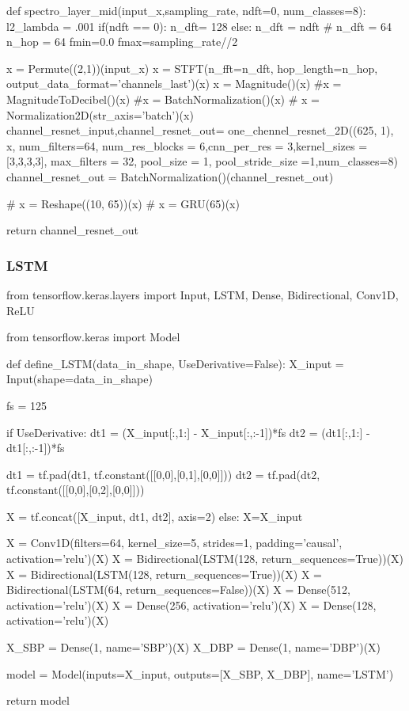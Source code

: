 \begin{python}
def spectro_layer_mid(input_x,sampling_rate, ndft=0, num_classes=8):
    l2_lambda = .001
    if(ndft == 0):
        n_dft= 128
    else:
        n_dft = ndft
    # n_dft = 64
    n_hop = 64
    fmin=0.0
    fmax=sampling_rate//2

    x = Permute((2,1))(input_x)
    x = STFT(n_fft=n_dft, hop_length=n_hop, output_data_format='channels_last')(x)
    x = Magnitude()(x)
    #x = MagnitudeToDecibel()(x)
    #x = BatchNormalization()(x)    # x = Normalization2D(str_axis='batch')(x)
    channel_resnet_input,channel_resnet_out= one_chennel_resnet_2D((625, 1), x, num_filters=64,
                    num_res_blocks = 6,cnn_per_res = 3,kernel_sizes = [3,3,3,3],
                    max_filters = 32, pool_size = 1,
                    pool_stride_size =1,num_classes=8)
    channel_resnet_out = BatchNormalization()(channel_resnet_out)

    # x = Reshape((10, 65))(x)
    # x = GRU(65)(x)

    return channel_resnet_out
\end{python}

\subsubsection*{LSTM}

\begin{python}
    from tensorflow.keras.layers import Input, LSTM, Dense, Bidirectional, Conv1D, ReLU

from tensorflow.keras import Model

def define_LSTM(data_in_shape, UseDerivative=False):
    X_input = Input(shape=data_in_shape)

    fs = 125

    if UseDerivative:
        dt1 = (X_input[:,1:] - X_input[:,:-1])*fs
        dt2 = (dt1[:,1:] - dt1[:,:-1])*fs

        dt1 = tf.pad(dt1, tf.constant([[0,0],[0,1],[0,0]]))
        dt2 = tf.pad(dt2, tf.constant([[0,0],[0,2],[0,0]]))

        X = tf.concat([X_input, dt1, dt2], axis=2)
    else:
        X=X_input


    X = Conv1D(filters=64, kernel_size=5, strides=1, padding='causal', activation='relu')(X)
    X = Bidirectional(LSTM(128, return_sequences=True))(X)
    X = Bidirectional(LSTM(128, return_sequences=True))(X)
    X = Bidirectional(LSTM(64, return_sequences=False))(X)
    X = Dense(512, activation='relu')(X)
    X = Dense(256, activation='relu')(X)
    X = Dense(128, activation='relu')(X)

    X_SBP = Dense(1, name='SBP')(X)
    X_DBP = Dense(1, name='DBP')(X)

    model = Model(inputs=X_input, outputs=[X_SBP, X_DBP], name='LSTM')

    return model
\end{python}

